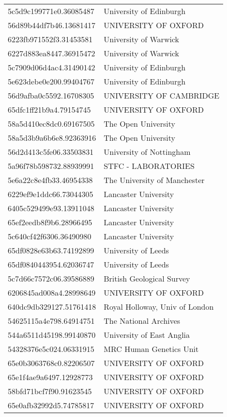 \begin{tabular}{ll}
5c5d9c199771e0.36085487 & University of Edinburgh \\
56d89b44df7b46.13681417 & UNIVERSITY OF OXFORD \\
6223fb971552f3.31453581 & University of Warwick \\
6227d883ea8447.36915472 & University of Warwick \\
5c7909d06d4ac4.31490142 & University of Edinburgh \\
5e623debe0e200.99404767 & University of Edinburgh \\
56d9afba0c5592.16708305 & UNIVERSITY OF CAMBRIDGE \\
65dfc1ff21b9a4.79154745 & UNIVERSITY OF OXFORD \\
58a5d410ec8dc0.69167505 & The Open University \\
58a5d3b9a6b6e8.92363916 & The Open University \\
56d2d413c5fe06.33503831 & University of Nottingham \\
5a96f78b598732.88939991 & STFC - LABORATORIES \\
5e6a22c8e4fb33.46954338 & The University of Manchester \\
6229ef9e1ddc66.73044305 & Lancaster University \\
6405c529499e93.13911048 & Lancaster University \\
65ef2eedb8f9b6.28966495 & Lancaster University \\
5c640cf42f6306.36490980 & Lancaster University \\
65df0828e63b63.74192899 & University of Leeds \\
65df0840443954.62036747 & University of Leeds \\
5c7d66c7572c06.39586889 & British Geological Survey \\
6206845ad008a4.28998649 & UNIVERSITY OF OXFORD \\
640dc9db329127.51761418 & Royal Holloway, Univ of London \\
54625115a4e798.64914751 & The National Archives \\
544a6511d45198.99140870 & University of East Anglia \\
54328376e5c024.06331915 & MRC Human Genetics Unit \\
65e0b3063768c0.82206507 & UNIVERSITY OF OXFORD \\
65e1f4ae9a6497.12928773 & UNIVERSITY OF OXFORD \\
58bfd71bcf7f90.91623545 & UNIVERSITY OF OXFORD \\
65e0afb32992d5.74785817 & UNIVERSITY OF OXFORD \\

\end{tabular}
